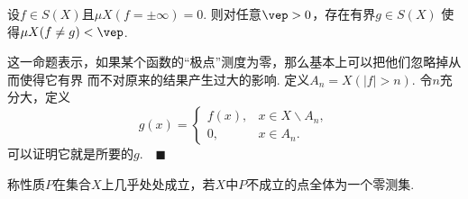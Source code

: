   \begin{thm}
    设$f\in S(X)$且$\mu X(f=\pm\infty)=0$. 则对任意$\vep>0$，存在有界$g\in S(X)$
    使得$\mu X(f\ne g)<\vep$.
  \end{thm}
  \remark
    这一命题表示，如果某个函数的“极点”测度为零，那么基本上可以把他们忽略掉从而使得它有界
    而不对原来的结果产生过大的影响.
  \proof
    定义$A_n = X(|f|>n)$. 令$n$充分大，定义
    \[
      g(x)=\begin{cases}
        f(x), & x\in X\backslash A_n,\\
        0,    & x\in A_n.
      \end{cases}
    \]
    可以证明它就是所要的$g$.$\quad\blacksquare$

  \begin{defi}[几乎处处]
    称性质$P$在集合$X$上几乎处处成立，若$X$中$P$不成立的点全体为一个零测集.
  \end{defi}

  



  



